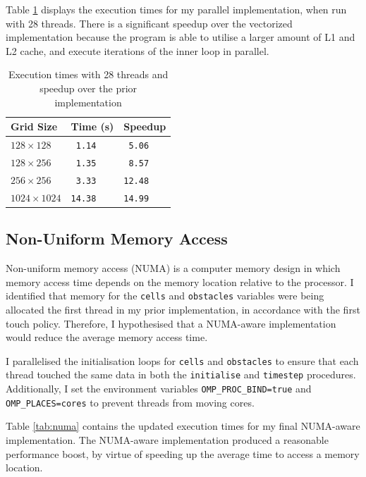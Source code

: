 \documentclass[twocolumn, a4paper]{article}
\begin{document}
Table \ref{tab:parallelised} displays the execution times for my parallel implementation, when run with 28 threads.
There is a significant speedup over the vectorized implementation because the program is able to utilise a larger amount of L1 and L2 cache, and execute iterations of the inner loop in parallel.

\begin{table}[htbp]
  \begin{center}
  \caption{Execution times with 28 threads and speedup over the prior implementation}\label{tab:parallelised}
  \begin{tabular}[t]{l | l l} 
      \hline\hline
      Grid Size&Time (s)&Speedup\\
      \hline
      $128 \times 128$&\texttt{ 1.14}&\texttt{ 5.06}\\
      $128 \times 256$&\texttt{ 1.35}&\texttt{ 8.57}\\
      $256 \times 256$&\texttt{ 3.33}&\texttt{12.48}\\
      $1024 \times 1024$&\texttt{14.38}&\texttt{14.99}\\
      \hline
    \end{tabular}
  \end{center}
\end{table}

\subsection{Non-Uniform Memory Access}

Non-uniform memory access (NUMA) is a computer memory design in which memory access time depends on the memory location relative to the processor.
I identified that memory for the \texttt{cells} and \texttt{obstacles} variables were being allocated the first thread in my prior implementation, in accordance with the first touch policy.
Therefore, I hypothesised that a NUMA-aware implementation would reduce the average memory access time.

I parallelised the initialisation loops for \texttt{cells} and \texttt{obstacles} to ensure that each thread touched the same data in both the \texttt{initialise} and \texttt{timestep} procedures.
Additionally, I set the environment variables \texttt{OMP\_PROC\_BIND=true} and \texttt{OMP\_PLACES=cores} to prevent threads from moving cores.

Table \ref{tab:numa} contains the updated execution times for my final NUMA-aware implementation.
The NUMA-aware implementation produced a reasonable performance boost, by virtue of speeding up the average time to access a memory location.
\end{document}
